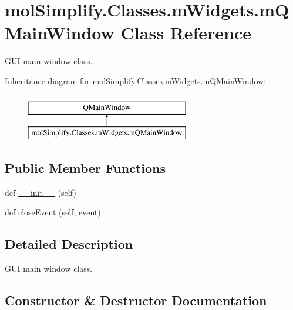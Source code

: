 \hypertarget{classmolSimplify_1_1Classes_1_1mWidgets_1_1mQMainWindow}{}\section{mol\+Simplify.\+Classes.\+m\+Widgets.\+m\+Q\+Main\+Window Class Reference}
\label{classmolSimplify_1_1Classes_1_1mWidgets_1_1mQMainWindow}


G\+UI main window class.  


Inheritance diagram for mol\+Simplify.\+Classes.\+m\+Widgets.\+m\+Q\+Main\+Window\+:\begin{figure}[H]
\begin{center}
\leavevmode
\includegraphics[height=2.000000cm]{classmolSimplify_1_1Classes_1_1mWidgets_1_1mQMainWindow}
\end{center}
\end{figure}
\subsection*{Public Member Functions}
\begin{DoxyCompactItemize}
\item 
def \hyperlink{classmolSimplify_1_1Classes_1_1mWidgets_1_1mQMainWindow_a501a2616567a0a203495409b3e76689b}{\+\_\+\+\_\+init\+\_\+\+\_\+} (self)
\item 
def \hyperlink{classmolSimplify_1_1Classes_1_1mWidgets_1_1mQMainWindow_ad056877a48172e3cdb203fb822058234}{close\+Event} (self, event)
\end{DoxyCompactItemize}


\subsection{Detailed Description}
G\+UI main window class. 

\subsection{Constructor \& Destructor Documentation}
\mbox{\label{classmolSimplify_1_1Classes_1_1mWidgets_1_1mQMainWindow_a501a2616567a0a203495409b3e76689b}} 
